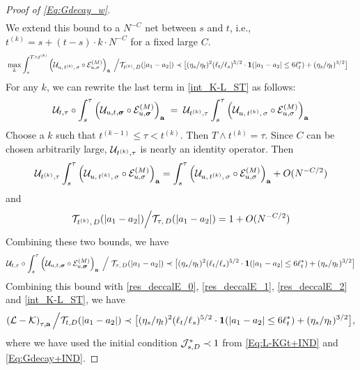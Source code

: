 \documentclass[10pt,reqno]{article}
\theoremstyle{plain} %
\theoremstyle{remark}
\numberwithin{equation}{section}
\begin{document}
\begin{proof}[Proof of \eqref{Eq:Gdecay_w}]
\begin{align}
 \end{align}
 We extend this bound to a $N^{-C}$ net between $s$ and $t$, i.e., $t^{(k)}=s+(t-s)\cdot k\cdot N^{-C}$   for a fixed large $C$.  
 \begin{align}\label{bsluwous2}
  & \max_k\int_s^{T\wedge t^{(k)}} \left(\mathcal{U}_{u,\, t^{(k)},\, \sigma} \circ \mathcal{E}_{u, \sigma}^{(M)}\right)_{\textbf{a}}\;\Big/{\cal T}_{t^{(k)}, \,D}(|a_1-a_2|) \prec  \big [ (\eta_s/\eta_{t })^{2}(\ell_{t }/\ell_s)^{5/2}  \cdot {\bf 1}(|a_1-a_2|\le 6\ell_{t }^*)+(\eta_s/\eta_{t })^{3/2} \big ]
 \end{align}
For any $k$, we can rewrite  the last term in   \eqref{int_K-L_ST} as follows: 
$$
 {\cal U}_{t,\tau}\circ \int_{s}^\tau \left(\mathcal{U}_{u, t, \boldsymbol{\sigma}} \circ \mathcal{E}^{(M)}_{u, \boldsymbol{\sigma}}\right)_{\textbf{a}}\;=\;{\cal U}_{t^{(k)},\tau }\int_s^{\tau } \left(\mathcal{U}_{u,\, t^{(k)},\, \sigma} \circ \mathcal{E}_{u, \sigma}^{(M)}\right)_{\textbf{a}} 
$$
Choose  a $k$ such that  $t^{(k-1)}\le \tau < t^{(k)}$. Then $T\wedge t^{(k)}= \tau$. 
Since $C$ can be chosen arbitrarily large,  $ {\cal U}_{t^{(k)},\tau }$ is  nearly an identity operator. Then
$$
{\cal U}_{t^{(k)},\tau }\int_s^{\tau } \left(\mathcal{U}_{u,\, t^{(k)},\, \sigma} \circ \mathcal{E}_{u, \sigma}^{(M)}\right)_{\textbf{a}} =\int_s^{\tau } \left(\mathcal{U}_{u,\, t^{(k)},\, \sigma} \circ \mathcal{E}_{u, \sigma}^{(M)}\right)_{\textbf{a}} +O(N^{-C/2})
$$
and
$$
{\cal T}_{t^{(k)}, \,D}(|a_1-a_2|)\Big/{\cal T}_{\tau, \,D}(|a_1-a_2|)=1+O(N^{-C/2})
$$
Combining  these two bounds, we have 
$$
 {\cal U}_{t,\tau}\circ \int_{s}^\tau \left(\mathcal{U}_{u, t, \boldsymbol{\sigma}} \circ \mathcal{E}^{(M)}_{u, \boldsymbol{\sigma}}\right)_{\textbf{a}} \; \Big/\; {\cal T}_{\tau, \,D}(|a_1-a_2|) \prec  \big [ (\eta_s/\eta_{t })^{2}(\ell_{t }/\ell_s)^{5/2}  \cdot {\bf 1}(|a_1-a_2|\le 6\ell_{t }^*)+(\eta_s/\eta_{t })^{3/2} \big ]
 $$
 Combining this  bound with  \eqref{res_deccalE_0}, \eqref{res_deccalE_1},   \eqref{res_deccalE_2}  and  \eqref{int_K-L_ST}, we have 
$$
\left({\cal L}-{\cal K}\right)_{\tau, \textbf{a}}\Big/{\cal T}_{t, D}(|a_1-a_2|) \prec   \big [ (\eta_s/\eta_t)^{2}(\ell_t/\ell_s)^{5/2}  \cdot {\bf 1}(|a_1-a_2|\le 6\ell_t^*)+(\eta_s/\eta_t)^{3/2} \big ], 
$$
where we have used the initial condition ${\cal J}^*_{s,D} \prec 1$ from \eqref{Eq:L-KGt+IND} and \eqref{Eq:Gdecay+IND}.  



\end{proof}
\end{document}
